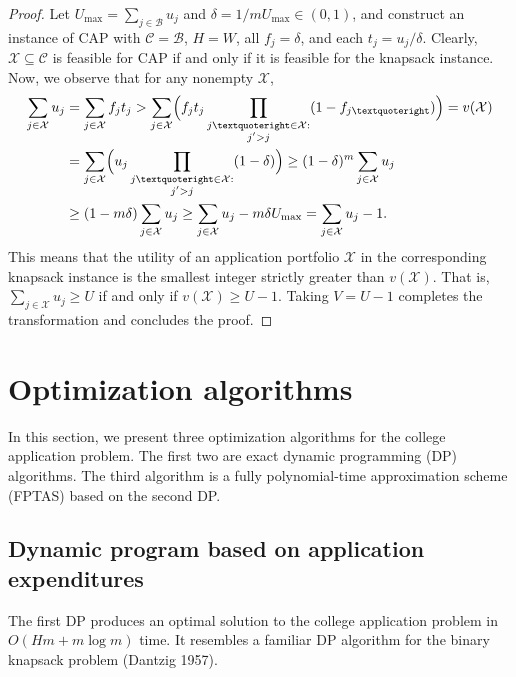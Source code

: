 \begin{proof}
Let $U_{\mathrm{max}} = \sum_{j \in \mathcal{B}} u_j$ and $\delta = {1} /{m U_{\mathrm{max}}} \in (0, 1)$, and construct an instance of CAP with $\mathcal{C} = \mathcal{B}$, $H = W$, all $f_j = \delta$, and each $t_j = u_j / \delta$. Clearly, $\mathcal{X} \subseteq \mathcal{C}$ is feasible for CAP if and only if it is feasible for the knapsack instance. Now, we observe that for any nonempty $\mathcal{X}$,
\begin{align}
\begin{split}
\sum_{j \in \mathcal{X}} u_j &=  \sum_{j \in \mathcal{X}} f_j t_j
> \sum_{j \in \mathcal{X}} \Bigl( f_j t_j \prod_{\substack{j’ \in \mathcal{X}: \\ j' > j}} (1 - f_{j’}) \Bigr)
= v(\mathcal{X}) \\
&= \sum_{j \in \mathcal{X}} \Bigl( u_j  \prod_{\substack{j’ \in \mathcal{X}: \\ j' > j}} (1 - \delta) \Bigr)
\geq (1 - \delta)^m \sum_{j \in \mathcal{X}} u_j \\
&\geq (1 - m\delta) \sum_{j \in \mathcal{X}} u_j 
\geq \sum_{j \in \mathcal{X}} u_j  - m\delta U_{\mathrm{max}}
= \sum_{j \in \mathcal{X}} u_j  - 1.
\end{split}
\end{align}
This means that the utility of an application portfolio $\mathcal{X}$ in the corresponding knapsack instance is the smallest integer strictly greater than $v( \mathcal{X})$. That is, $\sum_{j \in \mathcal{X}} u_j \geq U$ if and only if $v(\mathcal{X}) \geq U -1$. Taking $V = U-1$ completes the transformation and concludes the proof. 
\end{proof}






\section{Optimization algorithms} \label{sectionAlgos}

In this section, we present three optimization algorithms for the college application problem. The first two are exact dynamic programming (DP) algorithms. The third algorithm is a fully polynomial-time approximation scheme (FPTAS) based on the second DP.



\subsection{Dynamic program based on application expenditures}
The first DP produces an optimal solution to the college application problem in $O(Hm + m\log m)$ time. It resembles a familiar DP algorithm for the binary knapsack problem (Dantzig 1957).

